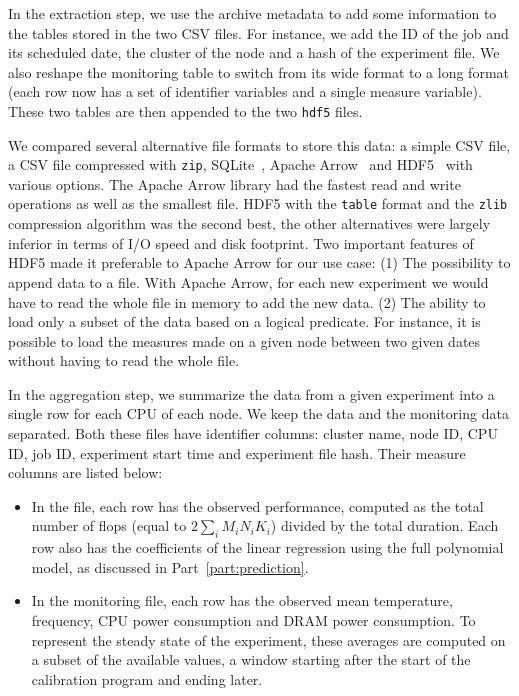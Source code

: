                In the extraction step, we use the archive metadata to add some information to the tables stored in the
                two CSV files. For instance, we add the ID of the job and its scheduled date, the cluster of the node
                and a hash of the experiment file. We also reshape the monitoring table to switch from its wide format
                to a long format (\ie each row now has a set of identifier variables and a single measure variable).
                These two tables are then appended to the two \texttt{hdf5} files.

                We compared several alternative file formats to store this data: a simple CSV file, a CSV file
                compressed with \texttt{zip}, SQLite~\cite{sqlite}, Apache Arrow~\cite{arrow} and HDF5~\cite{hdf5} with
                various options. The Apache Arrow library had the fastest read and write operations as well as the
                smallest file. HDF5 with the \texttt{table} format and the \texttt{zlib} compression algorithm was the
                second best, the other alternatives were largely inferior in terms of I/O speed and disk footprint. Two
                important features of HDF5 made it preferable to Apache Arrow for our use case:
                (1) The possibility to append data to a file. With Apache Arrow, for each new experiment we would have
                to read the whole file in memory to add the new data. (2) The ability to load only a subset of the data
                based on a logical predicate. For instance, it is possible to load the measures made on a given node
                between two given dates without having to read the whole file.

                In the aggregation step, we summarize the data from a given experiment into a single row for each CPU of
                each node. We keep the \dgemm data and the monitoring data separated. Both these files have identifier
                columns: cluster name, node ID, CPU ID, job ID, experiment start time and experiment file hash. Their
                measure columns are listed below:
                \begin{itemize}
                    \item In the \dgemm file, each row has the observed \dgemm performance, computed as the
                        total number of flops (equal to \(2\sum_i M_iN_iK_i\)) divided by the total duration. Each row
                        also has the coefficients of the linear regression using the full polynomial model, as discussed
                        in Part~\ref{part:prediction}.
                    \item In the monitoring file, each row has the observed mean temperature, frequency, CPU power
                        consumption and DRAM power consumption. To represent the steady state of the experiment, these
                        averages are computed on a subset of the available values, a window starting 
                        after the start of the \dgemm calibration program and ending  later.
                \end{itemize}

